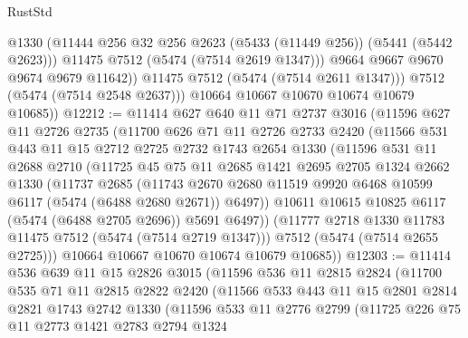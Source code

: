 \begin{lexlean}{RustStd}
\begin{coremodule}
                  @1330
                  (@11444 @256 @32 @256 @2623 (@5433 (@11449 @256)) (@5441 (@5442 @2623)))
                  @11475
                  @7512
                  (@5474 (@7514 @2619 @1347)))
                @9664
                @9667
                @9670
                @9674
                @9679
                @11642))
            @11475
            @7512
            (@5474 (@7514 @2611 @1347)))
          @7512
          (@5474 (@7514 @2548 @2637)))
        @10664
        @10667
        @10670
        @10674
        @10679
        @10685))
@12212 := @11414
    @627
    @640
    @11
    @71
    @2737
    @3016
    (@11596
      @627
      @11
      @2726
      @2735
      (@11700
        @626
        @71
        @11
        @2726
        @2733
        @2420
        (@11566
          @531
          @443
          @11
          @15
          @2712
          @2725
          @2732
          @1743
          @2654
          @1330
          (@11596
            @531
            @11
            @2688
            @2710
            (@11725
              @45
              @75
              @11
              @2685
              @1421
              @2695
              @2705
              @1324
              @2662
              @1330
              (@11737
                @2685
                (@11743
                  @2670
                  @2680
                  @11519
                  @9920
                  @6468
                  @10599
                  @6117
                  (@5474 (@6488 @2680 @2671))
                  @6497))
              @10611
              @10615
              @10825
              @6117
              (@5474 (@6488 @2705 @2696))
              @5691
              @6497))
          (@11777 @2718 @1330 @11783 @11475 @7512 (@5474 (@7514 @2719 @1347)))
          @7512
          (@5474 (@7514 @2655 @2725)))
        @10664
        @10667
        @10670
        @10674
        @10679
        @10685))
@12303 := @11414
    @536
    @639
    @11
    @15
    @2826
    @3015
    (@11596
      @536
      @11
      @2815
      @2824
      (@11700
        @535
        @71
        @11
        @2815
        @2822
        @2420
        (@11566
          @533
          @443
          @11
          @15
          @2801
          @2814
          @2821
          @1743
          @2742
          @1330
          (@11596
            @533
            @11
            @2776
            @2799
            (@11725
              @226
              @75
              @11
              @2773
              @1421
              @2783
              @2794
              @1324

\end{coremodule}
\end{lexlean}
